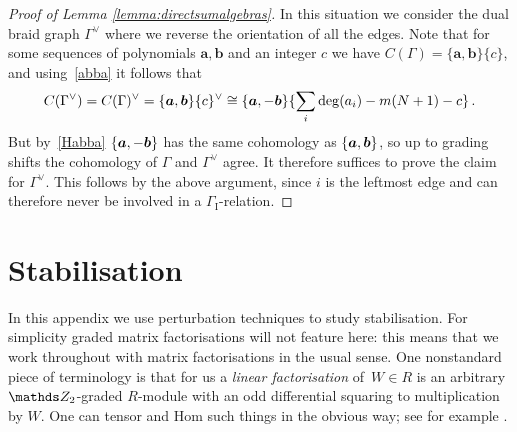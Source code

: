 \documentclass{compositio}
\theoremstyle{definition}
\numberwithin{equation}{section}
\begin{document}
\begin{proof}[Proof of Lemma \ref{lemma:directsumalgebras}]
In this situation we consider the dual braid graph $\Gamma^{\lor}$ where we reverse the orientation of all the edges. Note that for some sequences of polynomials $\boldsymbol{a},\boldsymbol{b}$ and an integer $c$ we have $C(\Gamma) = \{ \boldsymbol{a}, \boldsymbol{b} \}\{c\}$, and using~\eqref{abba} it follows that
\[
C(\Gamma^{\lor}) = C(\Gamma)^{\vee} = \{ \boldsymbol{a}, \boldsymbol{b} \}\{c\}^{\vee} \cong \{ \boldsymbol{a}, -\boldsymbol{b} \}\{ \sum_i \deg(a_i) - m(N+1) - c \}\,.
\]
But by~\eqref{Habba} $\{ \boldsymbol{a}, -\boldsymbol{b} \}$ has the same cohomology as $\{ \boldsymbol{a}, \boldsymbol{b} \}$, so up to grading shifts the cohomology of $\Gamma$ and $\Gamma^{\lor}$ agree. It therefore suffices to prove the claim for $\Gamma^{\lor}$. This follows by the above argument, since $i$ is the leftmost edge and can therefore never be involved in a $\Gamma_{\text{I}}$-relation.
\end{proof}

\section{Stabilisation}\label{section:morphismpert}

In this appendix we use perturbation techniques to study stabilisation. For simplicity graded matrix factorisations will not feature here: this means that we work throughout with matrix factorisations in the usual sense. One nonstandard piece of terminology is that for us a \emph{linear factorisation} of~$W \in R$ is an arbitrary $\Ztwo$-graded $R$-module with an odd differential squaring to multiplication by $W$. One can tensor and Hom such things in the obvious way; see for example \cite[Section 2]{dm1102.2957}.
\end{document}
